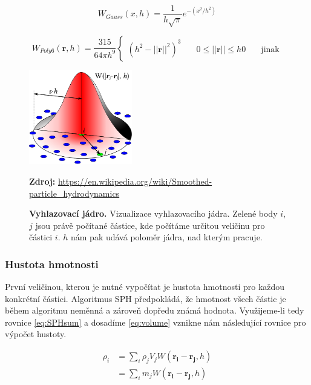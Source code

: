  \begin{equation}
     W_{Gauss}(x,h) = \frac{1}{h\sqrt{\pi}}e^{-(x^2/h^2)}
     \label{eq:1DGauss}
 \end{equation}
 
 \begin{equation}
     W_{Poly6}(\mathbf{r},h) = \frac{315}{64 \pi h^9}
     \begin{cases}
       (h^2 - ||\mathbf{r}||^2)^3    & \quad 0 \leq ||\mathbf{r}|| \leq h
       0                            & \quad \text{jinak}
     \end{cases}
     \label{eq:kernelPoly6}
 \end{equation}

\begin{figure}[hbt]
	\centering
	\captionsetup{justification=centering}
	\includegraphics[width=0.4\textwidth]{obrazky-figures/SPHInterpolationColorsVerbose.png}
	\caption{\textbf{Vyhlazovací jádro.} Vizualizace vyhlazovacího jádra. Zelené body $i$, $j$ jsou právě počítané částice, kde počítáme určitou veličinu pro částici $i$. $h$ nám pak udává poloměr jádra, nad kterým pracuje.}
	\textbf{Zdroj: } \url{https://en.wikipedia.org/wiki/Smoothed-particle_hydrodynamics}
	\label{fig:Kernel}
\end{figure}

\subsubsection{Hustota hmotnosti}
První veličinou, kterou je nutné vypočítat je hustota hmotnosti pro každou konkrétní částici. Algoritmus SPH předpokládá, že hmotnost všech částic je během algoritmu neměnná a zároveň dopředu známá hodnota. Využijeme-li tedy rovnice \ref{eq:SPHsum} a dosadíme \ref{eq:volume} vznikne nám následující rovnice pro výpočet hustoty.


\begin{equation}
    \begin{split}
        \rho_i  & = \sum_i \rho_j V_j W(\mathbf{r_i} - \mathbf{r_j},h) \\
                & = \sum_i m_j W(\mathbf{r_i} - \mathbf{r_j},h)
    \end{split}
    \label{eq:MassDensity}
\end{equation}

